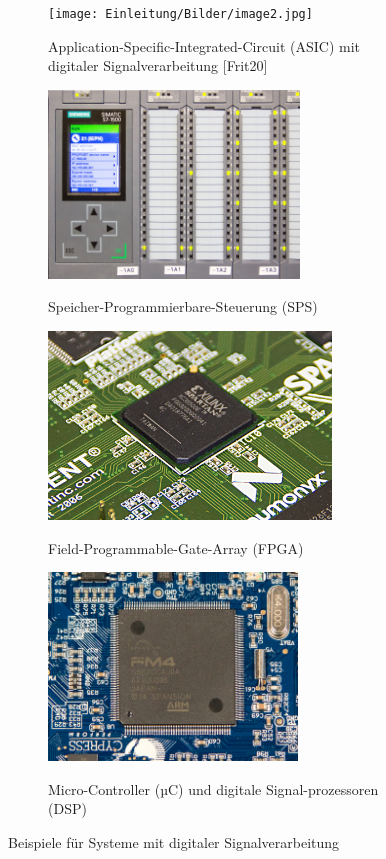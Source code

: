 \clearpage

\begin{figure}[h]

\begin{subfigure}{0.5\textwidth}
\caption{Application-Specific-Integrated-Circuit (ASIC) mit digitaler Signalverarbeitung [Frit20]}
\texttt{[image: Einleitung/Bilder/image2.jpg]} 
\label{fig:subim1}
\end{subfigure}
\begin{subfigure}{0.5\textwidth}
\caption{Speicher-Programmierbare-Steuerung (SPS)}
\includegraphics[width=0.9\linewidth, height=5cm]{Einleitung/Bilder/image3.jpg}
\label{fig:subim2}
\end{subfigure}
\begin{subfigure}{0.5\textwidth}
\caption{Field-Programmable-Gate-Array (FPGA)}
\includegraphics[width=0.9\linewidth, height=5cm]{Einleitung/Bilder/image4.jpg}
\label{fig:subim3}
\end{subfigure}
\begin{subfigure}{0.5\textwidth}
\caption{Micro-Controller (µC) und digitale Signal-prozessoren (DSP)}
\includegraphics[width=0.9\linewidth, height=5cm]{Einleitung/Bilder/image5.jpg}
\label{fig:subim4}
\end{subfigure}
\caption{Beispiele für Systeme mit digitaler Signalverarbeitung}
\label{fig:BsplfürSystememitdigitalerSignalverarbeitung}
\end{figure}

